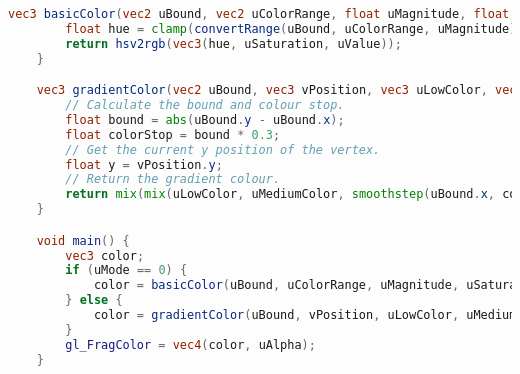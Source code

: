 
\begin{lstlisting}[language=GLSL,basicstyle=\scriptsize\ttfamily]
	vec3 basicColor(vec2 uBound, vec2 uColorRange, float uMagnitude, float uSaturation, float uLightness) {
		float hue = clamp(convertRange(uBound, uColorRange, uMagnitude), 0.0, 1.0);
		return hsv2rgb(vec3(hue, uSaturation, uValue));
	}

	vec3 gradientColor(vec2 uBound, vec3 vPosition, vec3 uLowColor, vec3 uMediumColor, vec3 uHighColor) {
		// Calculate the bound and colour stop.
		float bound = abs(uBound.y - uBound.x);
		float colorStop = bound * 0.3;
		// Get the current y position of the vertex.
		float y = vPosition.y;
		// Return the gradient colour.
	    return mix(mix(uLowColor, uMediumColor, smoothstep(uBound.x, colorStop, y)), uHighColor, smoothstep(colorStop, uBound.y, y));
	}

	void main() {
		vec3 color;
		if (uMode == 0) {
			color = basicColor(uBound, uColorRange, uMagnitude, uSaturation, uValue);
		} else {
			color = gradientColor(uBound, vPosition, uLowColor, uMediumColor, uHighColor);
		}
		gl_FragColor = vec4(color, uAlpha);
	}
\end{lstlisting}
